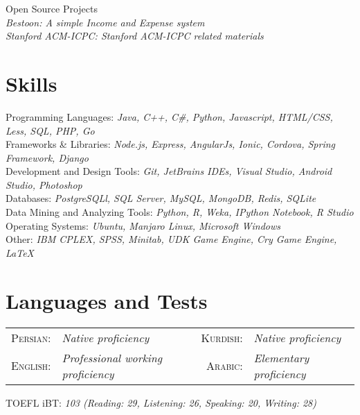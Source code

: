 \documentclass[a4paper,10pt]{article}
\newcommand{\skillItem}[2]{
	\textbullet\textnormal{ #1: }\emph{\color{darkgray}\small #2}}
\newcommand{\langItem}[2]{
	\textsc{ #1:}&\emph{\color{darkgray}#2}}
\newcommand{\TestItem}[2]{
	{ #1: }\emph{\color{darkgray}#2}}
\newcommand{\projectTitle}[1]{
	\textbullet\textnormal{ #1}}
\newcommand{\opensourceProjectSubTitle}[2]{
	\emph{\color{black}\small {\space\space\space\space\space}#1}{\emph{\color{darkgray}\small {#2}}}}
\newcommand{\latexLogo}{
	{\fb \LaTeX}\setmainfont[SmallCapsFont=Fontin-SmallCaps.otf]{Fontin.otf}}
\newcommand{\linkSign}{
	{\footnotesize\space\faExternalLink}}
\newcommand{\BestoonProject}{https://github.com/jadijadi/bestoon}
\newcommand{\StanfordCheatSheetProject}{https://github.com/jaehyunp/stanfordacm}
\begin{document}
		\projectTitle{ Open Source Projects }  \\
		\opensourceProjectSubTitle{Bestoon:}{ A simple Income and Expense system  \href{\BestoonProject}{\linkSign} }\\ %
		\opensourceProjectSubTitle{Stanford ACM-ICPC:}{ Stanford ACM-ICPC related materials \href{\StanfordCheatSheetProject}{\linkSign}} \vspace{1 mm}
	\section{Skills}
		\skillItem{Programming Languages}{Java, C++, {C\#}, Python, Javascript, HTML/CSS, Less, SQL, PHP, Go}\vspace{1 mm}\\
		\skillItem{Frameworks \& Libraries}{Node.js, Express, AngularJs, Ionic, Cordova, Spring Framework, Django}\vspace{1 mm}\\
		\skillItem{Development and Design Tools}{Git, JetBrains IDEs, Visual Studio, Android Studio, Photoshop}\vspace{1 mm}\\
		\skillItem{Databases}{PostgreSQLl, SQL Server, MySQL, MongoDB, Redis, SQLite}\vspace{1 mm}\\
		\skillItem{Data Mining and Analyzing Tools}{Python, R, Weka, IPython Notebook, R Studio}\vspace{1 mm}\\
		\skillItem{Operating Systems}{Ubuntu, Manjaro Linux, Microsoft Windows}\vspace{1 mm}\\
		\skillItem{Other}{IBM CPLEX, SPSS, Minitab, UDK Game Engine, Cry Game Engine, \latexLogo}\vspace{1 mm}
	 
	\section{Languages and Tests}
		 \begin{tabular}{rl  rl}
		 	\langItem{Persian}{Native proficiency} & \langItem{ Kurdish}{Native proficiency}\\
		 	\langItem{ English}{Professional working proficiency} & \langItem{ Arabic}{Elementary proficiency}\\
		 \end{tabular}

		 \hspace{1pt}\TestItem{ TOEFL iBT}{ 103 (Reading: 29, Listening: 26, Speaking: 20, Writing: 28)}
\end{document}
